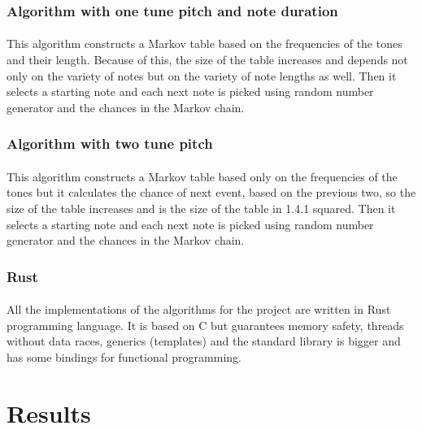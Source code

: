 \documentclass[]{article}
\begin{document}
            \subsubsection{Algorithm with one tune pitch and note duration}
            \paragraph{}This algorithm constructs a Markov table based on the frequencies of the tones and their length. Because of this, the size of the table increases and depends not only on the variety of notes but on the variety of note lengths as well. Then it selects a starting note and each next note is picked using random number generator and the chances in the Markov chain.
            \subsubsection{Algorithm with two tune pitch}
            \paragraph{}This algorithm constructs a Markov table based only on the frequencies of the tones but it calculates the chance of next event, based on the previous two, so the size of the table increases and is the size of the table in 1.4.1 squared. Then it selects a starting note and each next note is picked using random number generator and the chances in the Markov chain.
            \subsubsection{Rust}
            \paragraph{}All the implementations of the algorithms for the project are written in Rust programming language\cite{rust}. It is based on C but guarantees memory safety, threads without data races, generics (templates) and the standard library is bigger and has some bindings for functional programming.
    \section{Results}
\end{document}
